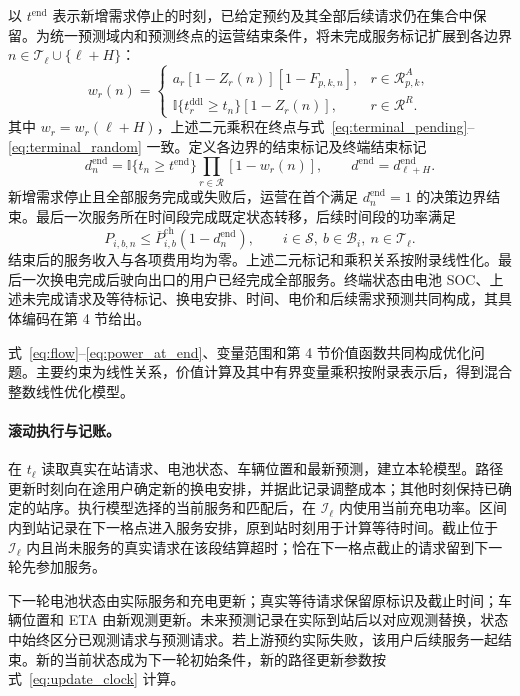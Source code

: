 \documentclass[12pt,a4paper,UTF8]{ctexart}
\numberwithin{equation}{section}
\newcommand{\ind}{\mathbb I}
\newcommand{\R}{\mathcal R}
\begin{document}
以 $t^{\mathrm{end}}$ 表示新增需求停止的时刻，已给定预约及其全部后续请求仍在集合中保留。为统一预测域内和预测终点的运营结束条件，将未完成服务标记扩展到各边界 $n\in\mathcal T_\ell\cup\{\ell+H\}$：
\begin{equation}
w_r(n)=\begin{cases}
a_r[1-Z_r(n)][1-F_{p,k,n}],&r\in\R_{p,k}^A,\\
\ind\{t_r^{\mathrm{ddl}}\ge t_n\}[1-Z_r(n)],&r\in\R^R.
\end{cases}
\label{eq:pending_each_boundary}
\end{equation}
其中 $w_r=w_r(\ell+H)$，上述二元乘积在终点与式~\eqref{eq:terminal_pending}--\eqref{eq:terminal_random} 一致。定义各边界的结束标记及终端结束标记
\begin{equation}
d_n^{\mathrm{end}}=
\ind\{t_n\ge t^{\mathrm{end}}\}
\prod_{r\in\R}[1-w_r(n)],\qquad
d^{\mathrm{end}}=d_{\ell+H}^{\mathrm{end}}.
\label{eq:operating_end}
\end{equation}
新增需求停止且全部服务完成或失败后，运营在首个满足 $d_n^{\mathrm{end}}=1$ 的决策边界结束。最后一次服务所在时间段完成既定状态转移，后续时间段的功率满足
\begin{equation}
P_{i,b,n}\le\overline P_{i,b}^{\mathrm{ch}}(1-d_n^{\mathrm{end}}),
\qquad i\in\mathcal S,\ b\in\mathcal B_i,\ n\in\mathcal T_\ell.
\label{eq:power_at_end}
\end{equation}
结束后的服务收入与各项费用均为零。上述二元标记和乘积关系按附录线性化。最后一次换电完成后驶向出口的用户已经完成全部服务。终端状态由电池 SOC、上述未完成请求及等待标记、换电安排、时间、电价和后续需求预测共同构成，其具体编码在第 4 节给出。

式~\eqref{eq:flow}--\eqref{eq:power_at_end}、变量范围和第 4 节价值函数共同构成优化问题。主要约束为线性关系，价值计算及其中有界变量乘积按附录表示后，得到混合整数线性优化模型。

\paragraph{滚动执行与记账。}
在 $t_\ell$ 读取真实在站请求、电池状态、车辆位置和最新预测，建立本轮模型。路径更新时刻向在途用户确定新的换电安排，并据此记录调整成本；其他时刻保持已确定的站序。执行模型选择的当前服务和匹配后，在 $\mathcal I_\ell$ 内使用当前充电功率。区间内到站记录在下一格点进入服务安排，原到站时刻用于计算等待时间。截止位于 $\mathcal I_\ell$ 内且尚未服务的真实请求在该段结算超时；恰在下一格点截止的请求留到下一轮先参加服务。

下一轮电池状态由实际服务和充电更新；真实等待请求保留原标识及截止时间；车辆位置和 ETA 由新观测更新。未来预测记录在实际到站后以对应观测替换，状态中始终区分已观测请求与预测请求。若上游预约实际失败，该用户后续服务一起结束。新的当前状态成为下一轮初始条件，新的路径更新参数按式~\eqref{eq:update_clock} 计算。
\end{document}
